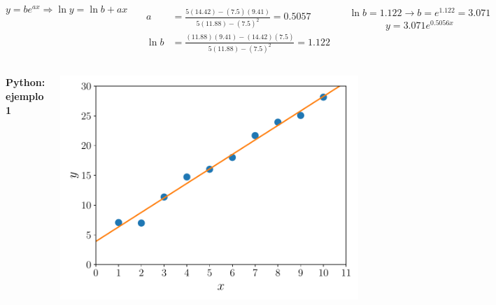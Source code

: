 \documentclass[9pt, aspectratio=169]{beamer}
\begin{document}
\begin{frame}
\begin{columns}
\cx
    \[ y = b e^{ax} \Rightarrow \ln y = \ln b + a x \]

\begin{align*}
    a &= \frac{5 (14.42) - (7.5)(9.41)}{5 (11.88) - (7.5)^2} = 0.5057 \\
    \ln b&= \frac{(11.88)(9.41) - (14.42)(7.5)}{5 (11.88) - (7.5)^2} = 1.122 
\end{align*}

\cx
$\ln b = 1.122 \rightarrow b = e^{1.122} = 3.071$
\[ y = 3.071 e^{0.5056 x} \]
\end{columns}
\end{frame}

\begin{frame}[fragile]
\begin{columns}
\cx
\textbf{Python: ejemplo 1}


\cx
\begin{center}
\includegraphics[scale=0.40]{code/ejem-01.pdf}
\end{center}

\end{columns}
\end{frame}
\end{document}
